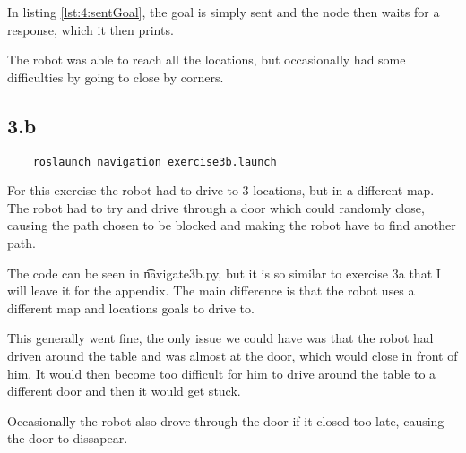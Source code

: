 In listing \ref{lst:4:sentGoal}, the goal is simply sent and the node then waits for a response, which it then prints.

The robot was able to reach all the locations, but occasionally had some difficulties by going to close by corners. 

\subsection*{3.b}
\begin{lstlisting}
	roslaunch navigation exercise3b.launch
\end{lstlisting}

For this exercise the robot had to drive to 3 locations, but in a different map. The robot had to try and drive through a door which could randomly close, causing the path chosen to be blocked and making the robot have to find another path.

The code can be seen in \t{navigate3b.py}, but it is so similar to exercise 3a that I will leave it for the appendix. The main difference is that the robot uses a different map and locations goals to drive to.

This generally went fine, the only issue we could have was that the robot had driven around the table and was almost at the door, which would close in front of him. It would then become too difficult for him to drive around the table to a different door and then it would get stuck.

Occasionally the robot also drove through the door if it closed too late, causing the door to dissapear.
